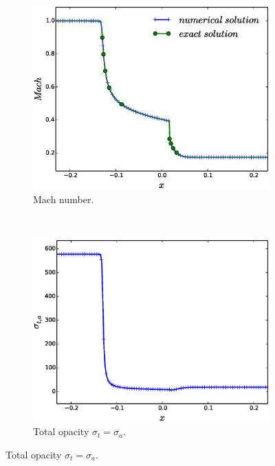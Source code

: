 \documentclass[times,doublespace]{fldauth}%
\begin{document}
\begin{figure}[h]
    \begin{center}
    \begin{subfigure}{0.32\textwidth}
    \centering
    \includegraphics[width=\linewidth]{figures/dpt-xs/mass-diff-mach-number-nel-2700-plot.eps}
    \caption{Mach number.}\label{fig:mach-3-dpt-xs-mach}
    \end{subfigure}
    ~    
    \begin{subfigure}{0.32\textwidth}
    \centering
    \includegraphics[width=\linewidth]{figures/dpt-xs/mass-diff-opacity-nel-2700-plot.eps}
    \caption{Total opacity $\sigma_t = \sigma_a$.}\label{fig:mach-3-dpt-xs-xs}
    \end{subfigure}

\end{center}
\end{figure}
\end{document}
